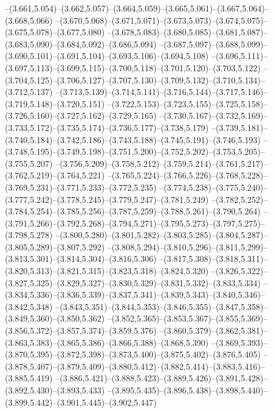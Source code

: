   --(3.661,5.054)--(3.662,5.057)--(3.664,5.059)--(3.665,5.061)--(3.667,5.064)--(3.668,5.066)%
  --(3.670,5.068)--(3.671,5.071)--(3.673,5.073)--(3.674,5.075)--(3.675,5.078)--(3.677,5.080)%
  --(3.678,5.083)--(3.680,5.085)--(3.681,5.087)--(3.683,5.090)--(3.684,5.092)--(3.686,5.094)%
  --(3.687,5.097)--(3.688,5.099)--(3.690,5.101)--(3.691,5.104)--(3.693,5.106)--(3.694,5.108)%
  --(3.696,5.111)--(3.697,5.113)--(3.699,5.115)--(3.700,5.118)--(3.701,5.120)--(3.703,5.122)%
  --(3.704,5.125)--(3.706,5.127)--(3.707,5.130)--(3.709,5.132)--(3.710,5.134)--(3.712,5.137)%
  --(3.713,5.139)--(3.714,5.141)--(3.716,5.144)--(3.717,5.146)--(3.719,5.148)--(3.720,5.151)%
  --(3.722,5.153)--(3.723,5.155)--(3.725,5.158)--(3.726,5.160)--(3.727,5.162)--(3.729,5.165)%
  --(3.730,5.167)--(3.732,5.169)--(3.733,5.172)--(3.735,5.174)--(3.736,5.177)--(3.738,5.179)%
  --(3.739,5.181)--(3.740,5.184)--(3.742,5.186)--(3.743,5.188)--(3.745,5.191)--(3.746,5.193)%
  --(3.748,5.195)--(3.749,5.198)--(3.751,5.200)--(3.752,5.202)--(3.753,5.205)--(3.755,5.207)%
  --(3.756,5.209)--(3.758,5.212)--(3.759,5.214)--(3.761,5.217)--(3.762,5.219)--(3.764,5.221)%
  --(3.765,5.224)--(3.766,5.226)--(3.768,5.228)--(3.769,5.231)--(3.771,5.233)--(3.772,5.235)%
  --(3.774,5.238)--(3.775,5.240)--(3.777,5.242)--(3.778,5.245)--(3.779,5.247)--(3.781,5.249)%
  --(3.782,5.252)--(3.784,5.254)--(3.785,5.256)--(3.787,5.259)--(3.788,5.261)--(3.790,5.264)%
  --(3.791,5.266)--(3.792,5.268)--(3.794,5.271)--(3.795,5.273)--(3.797,5.275)--(3.798,5.278)%
  --(3.800,5.280)--(3.801,5.282)--(3.803,5.285)--(3.804,5.287)--(3.805,5.289)--(3.807,5.292)%
  --(3.808,5.294)--(3.810,5.296)--(3.811,5.299)--(3.813,5.301)--(3.814,5.304)--(3.816,5.306)%
  --(3.817,5.308)--(3.818,5.311)--(3.820,5.313)--(3.821,5.315)--(3.823,5.318)--(3.824,5.320)%
  --(3.826,5.322)--(3.827,5.325)--(3.829,5.327)--(3.830,5.329)--(3.831,5.332)--(3.833,5.334)%
  --(3.834,5.336)--(3.836,5.339)--(3.837,5.341)--(3.839,5.343)--(3.840,5.346)--(3.842,5.348)%
  --(3.843,5.351)--(3.844,5.353)--(3.846,5.355)--(3.847,5.358)--(3.849,5.360)--(3.850,5.362)%
  --(3.852,5.365)--(3.853,5.367)--(3.855,5.369)--(3.856,5.372)--(3.857,5.374)--(3.859,5.376)%
  --(3.860,5.379)--(3.862,5.381)--(3.863,5.383)--(3.865,5.386)--(3.866,5.388)--(3.868,5.390)%
  --(3.869,5.393)--(3.870,5.395)--(3.872,5.398)--(3.873,5.400)--(3.875,5.402)--(3.876,5.405)%
  --(3.878,5.407)--(3.879,5.409)--(3.880,5.412)--(3.882,5.414)--(3.883,5.416)--(3.885,5.419)%
  --(3.886,5.421)--(3.888,5.423)--(3.889,5.426)--(3.891,5.428)--(3.892,5.430)--(3.893,5.433)%
  --(3.895,5.435)--(3.896,5.438)--(3.898,5.440)--(3.899,5.442)--(3.901,5.445)--(3.902,5.447)%
